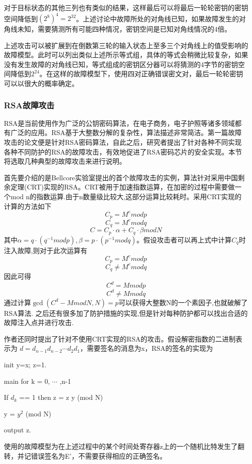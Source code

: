 \documentclass[a4paper,12pt]{article}
\begin{document}
\begin{CJK}{UTF8}{gkai}
对于目标状态的其他三列也有类似的结果，这样最后可以将最后一轮轮密钥的密钥空间降低到$(2^{8})^{4}=2^{32}$。上述讨论中故障所处的对角线已知，如果故障发生的对角线未知，需要猜测所有可能四种情况，密钥空间是已知对角线情况的4倍。

上述攻击可以被扩展到在倒数第三轮的输入状态上至多三个对角线上的值受影响的故障模型。此时可以列出类似上述所示等式组，具体的等式会稍微比较复杂，如果没有发生故障的对角线已知，等式组成的密钥区分器可以将猜测的4字节的密钥空间降低到$2^{24}$。在这样的故障模型下，使用四对正确错误密文对，最后一轮轮密钥可以以很大的概率确定。

\subsubsection{RSA故障攻击}
RSA是当前使用作为广泛的公钥密码算法，在电子商务，电子护照等诸多领域都有广泛的应用。RSA基于大整数分解的复杂性，算法描述非常简洁。第一篇故障攻击的论文便是针对RSA密码算法，自此之后，研究者提出了针对各种不同实现各种不同防护的RSA的故障攻击，有效地促进了RSA密码芯片的安全实现。本节将选取几种典型的故障攻击来进行说明。

首先要介绍的是Bellcore实验室提出的首个故障攻击的实例，算法针对采用中国剩余定理(CRT)实现的RSA。CRT被用于加速指数运算，在加密的过程中需要做一个mod n的指数运算.由于n数量级比较大,这部分运算比较耗时。采用CRT实现的计算的方法如下
$$C_{p}=M^{e}  mod p$$
$$C_{q}=M^{e} mod q$$
$$C = C_{p}\cdot \alpha+C_{q}\cdot\beta mod N$$
其中$\alpha=q\cdot(q^{-1}mod p), \beta=p\cdot(p^{-1}mod q)$。假设攻击者可以再上式中计算$C_{q}$时注入故障,则对于此次运算有
$$C_{p}=M^{e}  mod p$$
$$C_{q} \neq M^{e}  mod q$$
因此可得
$$C^{d}=M mod p$$
$$C^{d}\neq M mod q$$
通过计算$\gcd(C^{d}-M mod N, N)=p$可以获得大整数N的一个素因子,也就破解了RSA算法.
之后还有很多加了防护措施的实现,但是针对每种防护都可以找出合适的故障注入点并进行攻击.

作者还同时提出了针对不使用CRT实现的RSA的攻击。假设解密指数的二进制表示为 $d=d_{n-1}d_{n-2}\cdots d_{2}d_{1}$，需要签名的消息为x，RSA的签名的实现为
\begin{center}
\begin{description}
\item init y=x; z=1.
\item main for k = 0, $\cdots$ ,n-1
\item	If $d_{k}$ == 1 then z = z y (mod N)
\item	y = $y^{2}$ (mod N)
\item output z.
\end{description}
\end{center}
使用的故障模型为在上述过程中的某个时间处寄存器z上的一个随机比特发生了翻转，并记错误签名为E'，不需要获得相应的正确签名。


\end{CJK}
\end{document}
